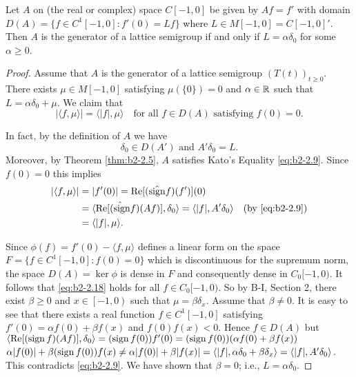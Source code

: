 \begin{example}\label{ex:b2-2.13}
Let $A$ on (the real or complex) space $C[-1,0]$ be given by $Af = f'$ with domain $D(A) = \{f \in C^{1}[-1,0] : f'(0) = Lf\}$ where $L \in M[-1,0] = C[-1,0]'$.
Then $A$ is the generator of a lattice semigroup if and only if $L = \alpha\delta_{0}$ for some $\alpha \geq 0$.
\end{example}

\begin{proof}
Assume that $A$ is the generator of a lattice semigroup $(T(t))_{t \geq 0}$.
There exists $\mu \in M[-1,0]$ satisfying $\mu(\{0\}) = 0$ and $\alpha \in \mathbb{R}$ such that $L = \alpha\delta_{0} + \mu$.
We claim that
\begin{equation}\label{eq:b2-2.18}
|\langle f,\mu \rangle| = \langle |f|,\mu \rangle \quad \text{for all } f \in D(A) \text{ satisfying } f(0) = 0.
\end{equation}

In fact, by the definition of $A$ we have
\begin{equation}\label{eq:b2-2.19}
\delta_{0} \in D(A') \text{ and } A'\delta_{0} = L.
\end{equation}
Moreover, by Theorem \ref{thm:b2-2.5}, $A$ satisfies Kato's Equality \eqref{eq:b2-2.9}.
Since $f(0) = 0$ this implies
\begin{align*}
|\langle f,\mu \rangle| &= |f'(0)| = \mathop{}\!\mathrm{Re}[(\hat{\operatorname{sign}} f)(f')](0) \\
&= \langle \mathop{}\!\mathrm{Re}[\hat{(\operatorname{sign}} f)(Af)],\delta_{0} \rangle = \langle |f|,A'\delta_{0} \rangle \quad \text{(by \eqref{eq:b2-2.9})} \\
&= \langle |f|,\mu \rangle.
\end{align*}

Since $\phi(f) = f'(0) - \langle f,\mu \rangle$ defines a linear form on the space $F = \{f \in C^{1}[-1,0] : f(0) = 0\}$ which is discontinuous for the supremum norm, the space $D(A) = \ker \phi$ is dense in $F$ and consequently dense in $C_{0}[-1,0)$.
It follows that \eqref{eq:b2-2.18} holds for all $f \in C_{0}[-1,0)$.
So by B-I, Section 2, there exist $\beta \geq 0$ and $x \in \left[-1,0\right)$ such that $\mu = \beta\delta_{x}$.
Assume that $\beta \neq 0$.
It is easy to see that there exists a real function $f \in C^{1}[-1,0]$ satisfying $f'(0) = \alpha f(0) + \beta f(x)$ and $f(0)f(x) < 0$.
Hence $f \in D(A)$ but $\langle \mathop{}\!\mathrm{Re}[(\operatorname{sign} f)(Af)],\delta_{0} \rangle = (\operatorname{sign} f(0))f'(0) = (\operatorname{sign} f(0))(\alpha f(0) + \beta f(x))$
$\alpha|f(0)| + \beta(\operatorname{sign} f(0))f(x) \neq \alpha|f(0)| + \beta|f(x)| = \langle |f|, \alpha\delta_{0} + \beta\delta_{x} \rangle = \langle |f|,A'\delta_{0} \rangle$.
This contradicts \eqref{eq:b2-2.9}.
We have shown that $\beta = 0$; i.e., $L = \alpha\delta_{0}$.


\end{proof}
